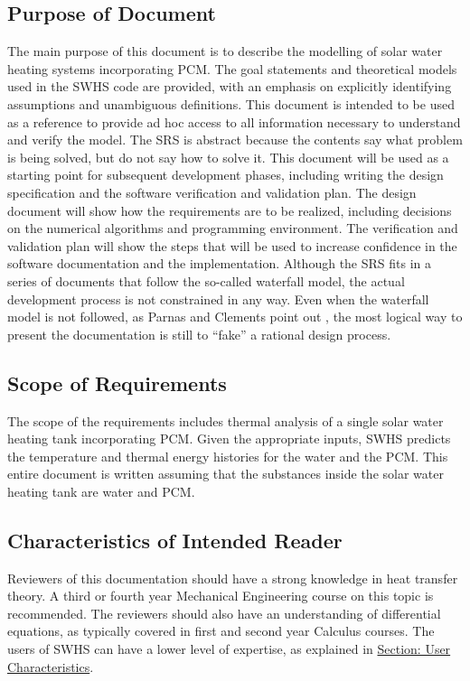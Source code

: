 \documentclass[12pt]{article}
\begin{document}
\subsection{Purpose of Document}
\label{Sec:DocPurpose}
The main purpose of this document is to describe the modelling of solar water heating systems incorporating PCM. The goal statements and theoretical models used in the SWHS code are provided, with an emphasis on explicitly identifying assumptions and unambiguous definitions. This document is intended to be used as a reference to provide ad hoc access to all information necessary to understand and verify the model. The SRS is abstract because the contents say what problem is being solved, but do not say how to solve it.
This document will be used as a starting point for subsequent development phases, including writing the design specification and the software verification and validation plan. The design document will show how the requirements are to be realized, including decisions on the numerical algorithms and programming environment. The verification and validation plan will show the steps that will be used to increase confidence in the software documentation and the implementation. Although the SRS fits in a series of documents that follow the so-called waterfall model, the actual development process is not constrained in any way. Even when the waterfall model is not followed, as Parnas and Clements point out \cite{parnasClements1986}, the most logical way to present the documentation is still to ``fake'' a rational design process.
\subsection{Scope of Requirements}
\label{Sec:ReqsScope}
The scope of the requirements includes thermal analysis of a single solar water heating tank incorporating PCM. Given the appropriate inputs, SWHS predicts the temperature and thermal energy histories for the water and the PCM. This entire document is written assuming that the substances inside the solar water heating tank are water and PCM.
\subsection{Characteristics of Intended Reader}
\label{Sec:ReaderChars}
Reviewers of this documentation should have a strong knowledge in heat transfer theory. A third or fourth year Mechanical Engineering course on this topic is recommended. The reviewers should also have an understanding of differential equations, as typically covered in first and second year Calculus courses. The users of SWHS can have a lower level of expertise, as explained in \hyperref[Sec:UserChars]{Section: User Characteristics}.
\end{document}
